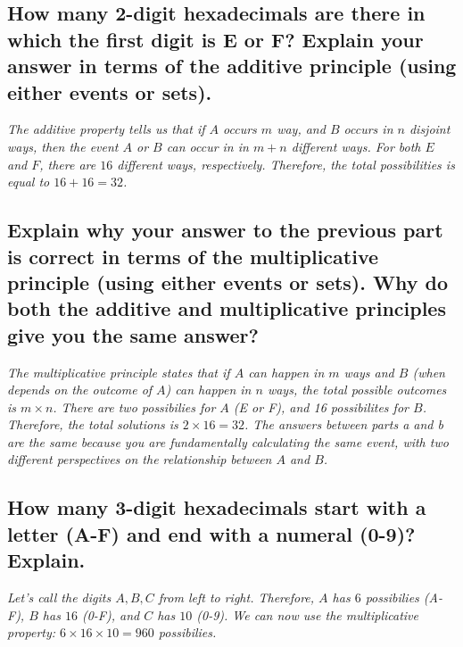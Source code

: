 \documentclass{article}
\begin{document}
\subsection{How many 2-digit hexadecimals are there in which the first digit is E or F?
    Explain your answer in terms of the additive principle (using either events or sets).}
\hspace{1cm}\textit{The additive property tells us that if $A$ occurs $m$ way, and $B$
    occurs in $n$ disjoint ways, then the event $A$ or $B$ can occur in in $m+n$ different ways.
    For both $E$ and $F$, there are $16$ different ways, respectively. Therefore, the total
possibilities is equal to $16+16=32$.}
\subsection{Explain why your answer to the previous part is correct in terms of the
    multiplicative principle (using either events or sets).
    Why do both the additive and multiplicative principles give you the same answer?}
\hspace{1cm}\textit{The multiplicative principle states that if $A$ can happen in $m$ ways and $B$
    (when depends on the outcome of $A$) can happen in $n$ ways, the total possible outcomes is
    $m\times n$. There are two possibilies for $A$ (E or F), and 16 possibilites for $B$. Therefore,
    the total solutions is $2\times 16 = 32$. The answers between parts a and b are the same because
    you are fundamentally calculating the same event, with two different perspectives on the
    relationship between $A$ and $B$.}
\subsection{How many 3-digit hexadecimals start with a letter (A-F) and end with a numeral (0-9)? Explain.}
\hspace{1cm}\textit{Let's call the digits $A,B,C$ from left to right. Therefore, $A$ has $6$ possibilies (A-F),
    $B$ has $16$ (0-F), and $C$ has $10$ (0-9). We can now use the multiplicative property: 
    $6\times 16\times 10 = 960$ possibilies.}
\clearpage
\end{document}
